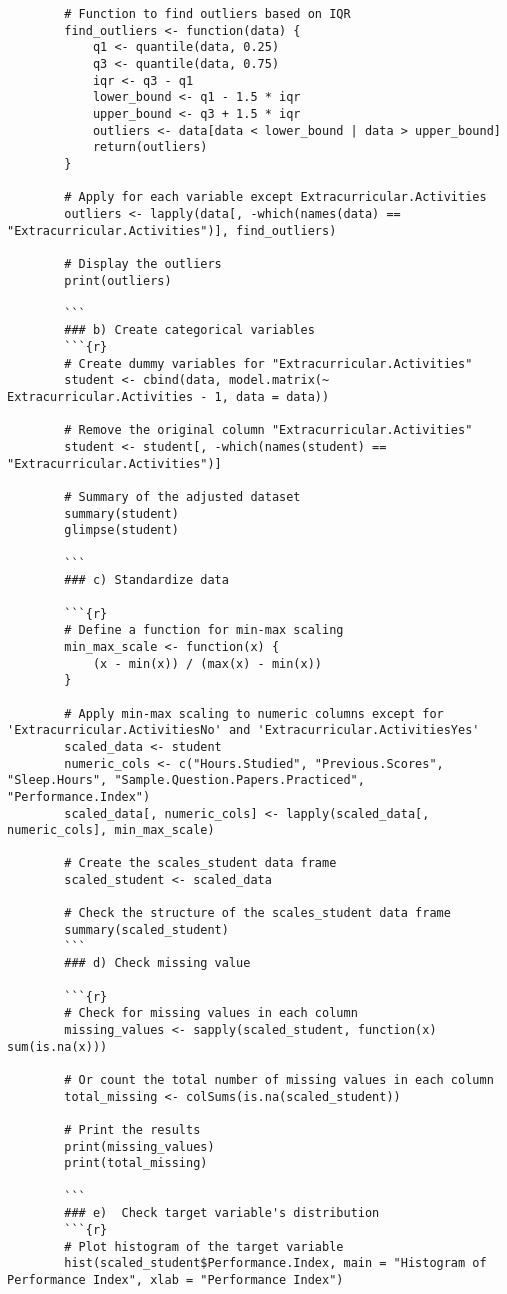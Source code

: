 \documentclass[12pt]{article}
\begin{document}
\begin{lstlisting}
		# Function to find outliers based on IQR
		find_outliers <- function(data) {
			q1 <- quantile(data, 0.25)
			q3 <- quantile(data, 0.75)
			iqr <- q3 - q1
			lower_bound <- q1 - 1.5 * iqr
			upper_bound <- q3 + 1.5 * iqr
			outliers <- data[data < lower_bound | data > upper_bound]
			return(outliers)
		}
		
		# Apply for each variable except Extracurricular.Activities
		outliers <- lapply(data[, -which(names(data) == "Extracurricular.Activities")], find_outliers)
		
		# Display the outliers
		print(outliers)
		
		```
		### b) Create categorical variables
		```{r}
		# Create dummy variables for "Extracurricular.Activities"
		student <- cbind(data, model.matrix(~ Extracurricular.Activities - 1, data = data))
		
		# Remove the original column "Extracurricular.Activities"
		student <- student[, -which(names(student) == "Extracurricular.Activities")]
		
		# Summary of the adjusted dataset
		summary(student)
		glimpse(student)
		
		```
		### c) Standardize data
		
		```{r}
		# Define a function for min-max scaling
		min_max_scale <- function(x) {
			(x - min(x)) / (max(x) - min(x))
		}
		
		# Apply min-max scaling to numeric columns except for 'Extracurricular.ActivitiesNo' and 'Extracurricular.ActivitiesYes'
		scaled_data <- student
		numeric_cols <- c("Hours.Studied", "Previous.Scores", "Sleep.Hours", "Sample.Question.Papers.Practiced", "Performance.Index")
		scaled_data[, numeric_cols] <- lapply(scaled_data[, numeric_cols], min_max_scale)
		
		# Create the scales_student data frame
		scaled_student <- scaled_data
		
		# Check the structure of the scales_student data frame
		summary(scaled_student)
		```
		### d) Check missing value
		
		```{r}
		# Check for missing values in each column
		missing_values <- sapply(scaled_student, function(x) sum(is.na(x)))
		
		# Or count the total number of missing values in each column
		total_missing <- colSums(is.na(scaled_student))
		
		# Print the results
		print(missing_values)
		print(total_missing)
		
		```
		### e)  Check target variable's distribution 
		```{r}
		# Plot histogram of the target variable
		hist(scaled_student$Performance.Index, main = "Histogram of Performance Index", xlab = "Performance Index")
		

\end{lstlisting}
\end{document}
